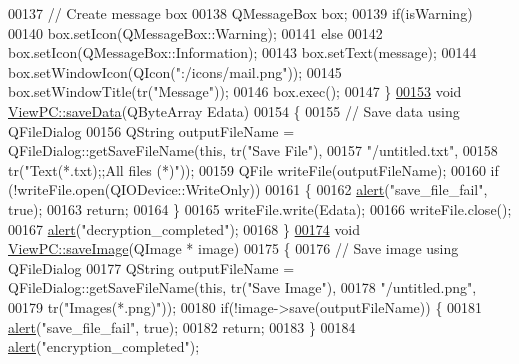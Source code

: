 \begin{DoxyCode}
00137     \textcolor{comment}{// Create message box}
00138     QMessageBox box;
00139     \textcolor{keywordflow}{if}(isWarning)
00140         box.setIcon(QMessageBox::Warning);
00141     \textcolor{keywordflow}{else}
00142         box.setIcon(QMessageBox::Information);
00143     box.setText(message);
00144     box.setWindowIcon(QIcon(\textcolor{stringliteral}{":/icons/mail.png"}));
00145     box.setWindowTitle(tr(\textcolor{stringliteral}{"Message"}));
00146     box.exec();
00147 \}
\hypertarget{viewpc_8cpp_source.tex_l00153}{}\hyperlink{class_view_p_c_aaff156103970be7c777beedaf0020604}{00153} \textcolor{keywordtype}{void} \hyperlink{class_view_p_c_aaff156103970be7c777beedaf0020604}{ViewPC::saveData}(QByteArray Edata)
00154 \{
00155     \textcolor{comment}{// Save data using QFileDialog}
00156     QString outputFileName = QFileDialog::getSaveFileName(\textcolor{keyword}{this}, tr(\textcolor{stringliteral}{"Save File"}),
00157                                \textcolor{stringliteral}{"/untitled.txt"},
00158                                tr(\textcolor{stringliteral}{"Text(*.txt);;All files (*)"}));
00159     QFile writeFile(outputFileName);
00160     \textcolor{keywordflow}{if} (!writeFile.open(QIODevice::WriteOnly))
00161     \{
00162         \hyperlink{class_view_p_c_a7c467169467789561078abc9d4fe57bd}{alert}(\textcolor{stringliteral}{"save\_file\_fail"}, \textcolor{keyword}{true});
00163         \textcolor{keywordflow}{return};
00164     \}
00165     writeFile.write(Edata);
00166     writeFile.close();
00167     \hyperlink{class_view_p_c_a7c467169467789561078abc9d4fe57bd}{alert}(\textcolor{stringliteral}{"decryption\_completed"});
00168 \}
\hypertarget{viewpc_8cpp_source.tex_l00174}{}\hyperlink{class_view_p_c_a7901ce10ffaaf2387bef1db7feea342d}{00174} \textcolor{keywordtype}{void} \hyperlink{class_view_p_c_a7901ce10ffaaf2387bef1db7feea342d}{ViewPC::saveImage}(QImage * image)
00175 \{
00176     \textcolor{comment}{// Save image using QFileDialog}
00177     QString outputFileName = QFileDialog::getSaveFileName(\textcolor{keyword}{this}, tr(\textcolor{stringliteral}{"Save Image"}),
00178                                \textcolor{stringliteral}{"/untitled.png"},
00179                                tr(\textcolor{stringliteral}{"Images(*.png)"}));
00180     \textcolor{keywordflow}{if}(!image->save(outputFileName)) \{
00181         \hyperlink{class_view_p_c_a7c467169467789561078abc9d4fe57bd}{alert}(\textcolor{stringliteral}{"save\_file\_fail"}, \textcolor{keyword}{true});
00182         \textcolor{keywordflow}{return};
00183     \}
00184     \hyperlink{class_view_p_c_a7c467169467789561078abc9d4fe57bd}{alert}(\textcolor{stringliteral}{"encryption\_completed"});

\end{DoxyCode}
